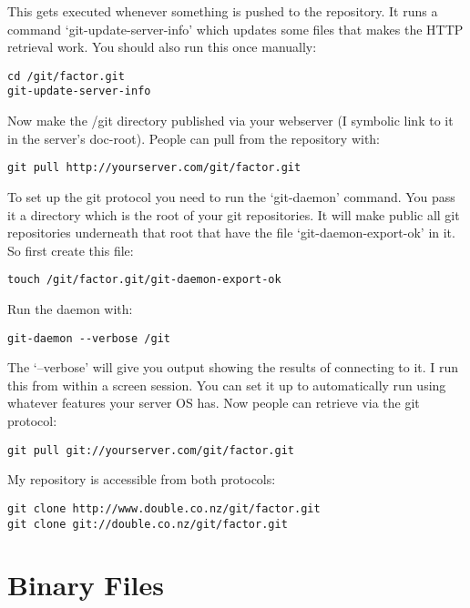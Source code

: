 This gets executed whenever something is pushed to the repository. It
runs a command `git-update-server-info' which updates some files that
makes the HTTP retrieval work. You should also run this once manually:

\begin{verbatim}
cd /git/factor.git
git-update-server-info
\end{verbatim}

Now make the /git directory published via your webserver (I symbolic
link to it in the server's doc-root). People can pull from the
repository with:

\begin{verbatim}
git pull http://yourserver.com/git/factor.git
\end{verbatim}

To set up the git protocol you need to run the `git-daemon'
command. You pass it a directory which is the root of your git
repositories. It will make public all git repositories underneath that
root that have the file `git-daemon-export-ok' in it. So first create
this file:

\begin{verbatim}
touch /git/factor.git/git-daemon-export-ok
\end{verbatim}

Run the daemon with:

\begin{verbatim}
git-daemon --verbose /git
\end{verbatim}

The `--verbose' will give you output showing the results of connecting
to it. I run this from within a screen session. You can set it up to
automatically run using whatever features your server OS has. Now
people can retrieve via the git protocol:

\begin{verbatim}
git pull git://yourserver.com/git/factor.git
\end{verbatim}

My repository is accessible from both protocols:

\begin{verbatim}
git clone http://www.double.co.nz/git/factor.git
git clone git://double.co.nz/git/factor.git
\end{verbatim}

\section{Binary Files}

